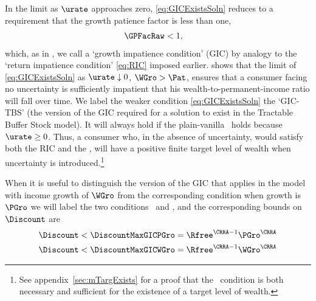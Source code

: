 \documentclass{\handout}
\begin{document}
In the limit as $\urate$ approaches zero, \eqref{eq:GICExistsSoln} reduces to a requirement that the growth patience factor is less than one,
\begin{equation}\begin{gathered}\begin{aligned}
  \GPFacRaw & <  1 \label{eq:GICPGro}
,\end{aligned}\end{gathered}\end{equation}
which, as in ,  we call a `growth impatience condition' (GIC) by analogy to the `return impatience condition' \eqref{eq:RIC} imposed earlier.   shows that the limit of \eqref{eq:GICExistsSoln} as $\urate \downarrow 0$, $\WGro > \Pat$, ensures that a consumer facing no uncertainty is sufficiently impatient that his wealth-to-permanent-income ratio will fall over time.  
We label the weaker condition \eqref{eq:GICExistsSoln} the `GIC-TBS' (the version of the GIC required for a solution to exist in the Tractable Buffer Stock model).  It will always hold if the plain-vanilla \GICWGro~holds because $\urate \geq 0$.  Thus, a consumer who, in the absence of uncertainty, would satisfy both the RIC and the \GICWGro, will have a positive finite target level of wealth when uncertainty is introduced.\footnote{See appendix~\ref{sec:mTargExists} for a proof that the \GICPGro~condition is both necessary and sufficient for the existence of a target level of wealth.}

When it is useful to distinguish the version of the GIC that applies in the model with income growth of $\WGro$ from the corresponding condition when growth is $\PGro$ we will label the two conditions \GICPGro~and \GICWGro, and the corresponding bounds on $\Discount$ are
\begin{equation}\begin{gathered}\begin{aligned}
   \Discount < \DiscountMaxGICPGro & =  \Rfree^{\CRRA-1}\PGro^{\CRRA}
\\ \Discount < \DiscountMaxGICWGro & =  \Rfree^{\CRRA-1}\WGro^{\CRRA}
\end{aligned}\end{gathered}\end{equation}
\end{document}
